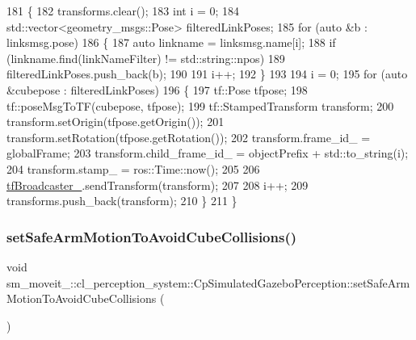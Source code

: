 \begin{DoxyCode}
181             \{
182                 transforms.clear();
183                 \textcolor{keywordtype}{int} i = 0;
184                 std::vector<geometry\_msgs::Pose> filteredLinkPoses;
185                 \textcolor{keywordflow}{for} (\textcolor{keyword}{auto} &b : linksmsg.pose)
186                 \{
187                     \textcolor{keyword}{auto} linkname = linksmsg.name[i];
188                     \textcolor{keywordflow}{if} (linkname.find(linkNameFilter) != std::string::npos)
189                         filteredLinkPoses.push\_back(b);
190 
191                     i++;
192                 \}
193 
194                 i = 0;
195                 \textcolor{keywordflow}{for} (\textcolor{keyword}{auto} &cubepose : filteredLinkPoses)
196                 \{
197                     tf::Pose tfpose;
198                     tf::poseMsgToTF(cubepose, tfpose);
199                     tf::StampedTransform transform;
200                     transform.setOrigin(tfpose.getOrigin());
201                     transform.setRotation(tfpose.getRotation());
202                     transform.frame\_id\_ = globalFrame;
203                     transform.child\_frame\_id\_ = objectPrefix + std::to\_string(i);
204                     transform.stamp\_ = ros::Time::now();
205 
206                     \hyperlink{classsm__moveit__4_1_1cl__perception__system_1_1CpSimulatedGazeboPerception_a413594aa743f273c844795ff9f2f724b}{tfBroadcaster\_}.sendTransform(transform);
207 
208                     i++;
209                     transforms.push\_back(transform);
210                 \}
211             \}
\end{DoxyCode}
\mbox{\label{classsm__moveit__4_1_1cl__perception__system_1_1CpSimulatedGazeboPerception_af42b5a4e239fcac98a222c34115c9bc0}} 
\subsubsection{\texorpdfstring{set\+Safe\+Arm\+Motion\+To\+Avoid\+Cube\+Collisions()}{setSafeArmMotionToAvoidCubeCollisions()}}
{\footnotesize\ttfamily void sm\+\_\+moveit\+\_\+::cl\+\_\+perception\+\_\+system\+::\+Cp\+Simulated\+Gazebo\+Perception\+::set\+Safe\+Arm\+Motion\+To\+Avoid\+Cube\+Collisions (\begin{DoxyParamCaption}{ }\end{DoxyParamCaption})\hspace{0.3cm}{\ttfamily [inline]}}



